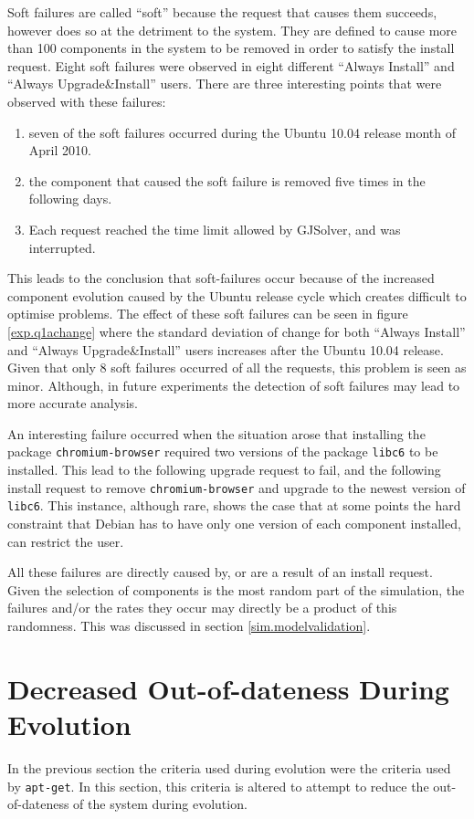 Soft failures are called ``soft'' because the request that causes them succeeds, however does so at the detriment to the system.
They are defined to cause more than 100 components in the system to be removed in order to satisfy the install request.
Eight soft failures were observed in eight different ``Always Install'' and ``Always Upgrade\&Install'' users.
There are three interesting points that were observed with these failures:
\begin{enumerate}
  \item seven of the soft failures occurred during the Ubuntu 10.04 release month of April 2010.
  \item the component that caused the soft failure is removed five times in the following days.
  \item Each request reached the time limit allowed by GJSolver, and was interrupted. 
\end{enumerate}
This leads to the conclusion that soft-failures occur because of the increased component evolution caused by the Ubuntu release cycle which creates difficult to optimise problems.
The effect of these soft failures can be seen in figure \ref{exp.q1achange} 
where the standard deviation of change for both ``Always Install'' and ``Always Upgrade\&Install'' users increases after the Ubuntu 10.04 release.
Given that only 8 soft failures occurred of all the requests, this problem is seen as minor.
Although, in future experiments the detection of soft failures may lead to more accurate analysis. 

An interesting failure occurred when the situation arose that installing the package \texttt{chromium-browser} required two versions of the package \texttt{libc6} to be installed. 
This lead to the following upgrade request to fail, and the following install request to remove \texttt{chromium-browser} and upgrade to the newest version of \texttt{libc6}.
This instance, although rare, shows the case that at some points the hard constraint that Debian has to have only one version of each component installed,
can restrict the user.

All these failures are directly caused by, or are a result of an install request.
Given the selection of components is the most random part of the simulation, the failures and/or the rates they occur may directly be a product of this randomness.
This was discussed in section \ref{sim.modelvalidation}.


\section{Decreased Out-of-dateness During Evolution}
In the previous section the criteria used during evolution were the criteria used by \texttt{apt-get}.
In this section, this criteria is altered to attempt to reduce the out-of-dateness of the system during evolution.


